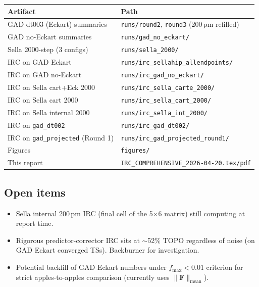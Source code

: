 \documentclass[11pt]{article}
\begin{document}
\begin{center}
\begin{tabular}{ll}
\toprule
Artifact & Path \\
\midrule
GAD dt003 (Eckart) summaries & \texttt{runs/round2}, \texttt{round3} (200\,pm refilled) \\
GAD no-Eckart summaries      & \texttt{runs/gad\_no\_eckart/} \\
Sella 2000-step (3 configs)  & \texttt{runs/sella\_2000/} \\
IRC on GAD Eckart            & \texttt{runs/irc\_sellahip\_allendpoints/} \\
IRC on GAD no-Eckart         & \texttt{runs/irc\_gad\_no\_eckart/} \\
IRC on Sella cart+Eck 2000   & \texttt{runs/irc\_sella\_carte\_2000/} \\
IRC on Sella cart 2000       & \texttt{runs/irc\_sella\_cart\_2000/} \\
IRC on Sella internal 2000   & \texttt{runs/irc\_sella\_int\_2000/} \\
IRC on \texttt{gad\_dt002}   & \texttt{runs/irc\_gad\_dt002/} \\
IRC on \texttt{gad\_projected} (Round 1) & \texttt{runs/irc\_gad\_projected\_round1/} \\
Figures                      & \texttt{figures/} \\
This report                  & \texttt{IRC\_COMPREHENSIVE\_2026-04-20.tex/pdf} \\
\bottomrule
\end{tabular}
\end{center}

\subsection{Open items}

\begin{itemize}[nosep,leftmargin=1.5em]
\item Sella internal 200\,pm IRC (final cell of the 5$\times$6 matrix) still
      computing at report time.
\item Rigorous predictor-corrector IRC sits at $\sim$52\% TOPO regardless
      of noise (on GAD Eckart converged TSs). Backburner for investigation.
\item Potential backfill of GAD Eckart numbers under $f_{\max}{<}0.01$ criterion
      for strict apples-to-apples comparison (currently uses $\|\mathbf{F}\|_{\text{mean}}$).
\end{itemize}
\end{document}
